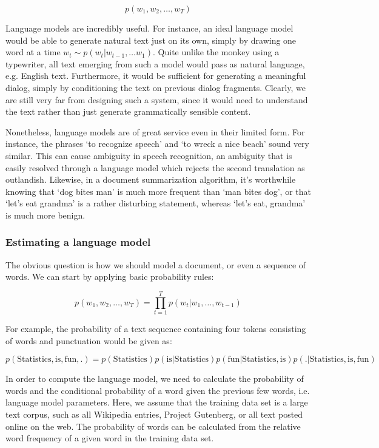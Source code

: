$$p(w_1, w_2, \ldots, w_T)$$

Language models are incredibly useful. For instance, an ideal language model would be able to generate natural text just on its own, simply by drawing one word at a time $w_t \sim p(w_t|w_{t-1}, \ldots w_1)$. Quite unlike the monkey using a typewriter, all text emerging from such a model would pass as natural language, e.g. English text. Furthermore, it would be sufficient for generating a meaningful dialog, simply by conditioning the text on previous dialog fragments. Clearly, we are still very far from designing such a system, since it would need to understand the text rather than just generate grammatically sensible content.

Nonetheless, language models are of great service even in their limited form. For instance, the phrases ‘to recognize speech’ and ‘to wreck a nice beach’ sound very similar. This can cause ambiguity in speech recognition, an ambiguity that is easily resolved through a language model which rejects the second translation as outlandish. Likewise, in a document summarization algorithm, it’s worthwhile knowing that ‘dog bites man’ is much more frequent than ‘man bites dog’, or that ‘let’s eat grandma’ is a rather disturbing statement, whereas ‘let’s eat, grandma’ is much more benign.

\subsubsection{Estimating a language model}

The obvious question is how we should model a document, or even a sequence of words. We can start by applying basic probability rules:

$$p(w_1, w_2, \ldots, w_T) = \prod_{t=1}^T p(w_t | w_1, \ldots, w_{t-1})$$

For example, the probability of a text sequence containing four tokens consisting of words and punctuation would be given as:

$$p(\mathrm{Statistics}, \mathrm{is},  \mathrm{fun}, \mathrm{.}) =  p(\mathrm{Statistics}) p(\mathrm{is} | \mathrm{Statistics}) p(\mathrm{fun} | \mathrm{Statistics}, \mathrm{is}) p(\mathrm{.} | \mathrm{Statistics}, \mathrm{is}, \mathrm{fun})$$

In order to compute the language model, we need to calculate the probability of words and the conditional probability of a word given the previous few words, i.e. language model parameters. Here, we assume that the training data set is a large text corpus, such as all Wikipedia entries, Project Gutenberg, or all text posted online on the web. The probability of words can be calculated from the relative word frequency of a given word in the training data set.

